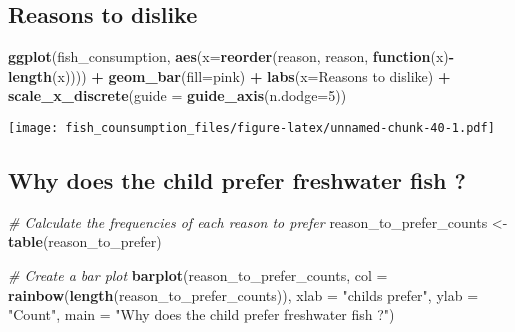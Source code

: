 \documentclass[
]{article}
\newenvironment{Shaded}{\begin{snugshade}}{\end{snugshade}}
\newcommand{\AttributeTok}[1]{\textcolor[rgb]{0.13,0.29,0.53}{#1}}
\newcommand{\CommentTok}[1]{\textcolor[rgb]{0.56,0.35,0.01}{\textit{#1}}}
\newcommand{\ControlFlowTok}[1]{\textcolor[rgb]{0.13,0.29,0.53}{\textbf{#1}}}
\newcommand{\DecValTok}[1]{\textcolor[rgb]{0.00,0.00,0.81}{#1}}
\newcommand{\FunctionTok}[1]{\textcolor[rgb]{0.13,0.29,0.53}{\textbf{#1}}}
\newcommand{\NormalTok}[1]{#1}
\newcommand{\OtherTok}[1]{\textcolor[rgb]{0.56,0.35,0.01}{#1}}
\newcommand{\SpecialCharTok}[1]{\textcolor[rgb]{0.81,0.36,0.00}{\textbf{#1}}}
\newcommand{\StringTok}[1]{\textcolor[rgb]{0.31,0.60,0.02}{#1}}
\begin{document}
\hypertarget{reasons-to-dislike}{%
\subsection{Reasons to dislike}\label{reasons-to-dislike}}

\begin{Shaded}
\begin{Highlighting}[]
\FunctionTok{ggplot}\NormalTok{(fish\_consumption, }\FunctionTok{aes}\NormalTok{(}\AttributeTok{x=}\FunctionTok{reorder}\NormalTok{(reason, reason, }\ControlFlowTok{function}\NormalTok{(x)}\SpecialCharTok{{-}}\FunctionTok{length}\NormalTok{(x)))) }\SpecialCharTok{+}
  \FunctionTok{geom\_bar}\NormalTok{(}\AttributeTok{fill=}\StringTok{\textquotesingle{}pink\textquotesingle{}}\NormalTok{) }\SpecialCharTok{+} 
  \FunctionTok{labs}\NormalTok{(}\AttributeTok{x=}\StringTok{\textquotesingle{}Reasons to dislike\textquotesingle{}}\NormalTok{) }\SpecialCharTok{+}
  \FunctionTok{scale\_x\_discrete}\NormalTok{(}\AttributeTok{guide =} \FunctionTok{guide\_axis}\NormalTok{(}\AttributeTok{n.dodge=}\DecValTok{5}\NormalTok{))}
\end{Highlighting}
\end{Shaded}

\texttt{[image: fish\_counsumption\_files/figure-latex/unnamed-chunk-40-1.pdf]}

\hypertarget{why-does-the-child-prefer-freshwater-fish}{%
\subsection{Why does the child prefer freshwater fish
?}\label{why-does-the-child-prefer-freshwater-fish}}

\begin{Shaded}
\begin{Highlighting}[]
\CommentTok{\# Calculate the frequencies of each reason to prefer}
\NormalTok{reason\_to\_prefer\_counts }\OtherTok{\textless{}{-}} \FunctionTok{table}\NormalTok{(reason\_to\_prefer)}

\CommentTok{\# Create a bar plot}
\FunctionTok{barplot}\NormalTok{(reason\_to\_prefer\_counts, }\AttributeTok{col =} \FunctionTok{rainbow}\NormalTok{(}\FunctionTok{length}\NormalTok{(reason\_to\_prefer\_counts)), }
        \AttributeTok{xlab =} \StringTok{"child\textquotesingle{}s prefer"}\NormalTok{, }\AttributeTok{ylab =} \StringTok{"Count"}\NormalTok{, }\AttributeTok{main =} \StringTok{"Why does the child prefer freshwater fish ?"}\NormalTok{)}
\end{Highlighting}
\end{Shaded}
\end{document}
